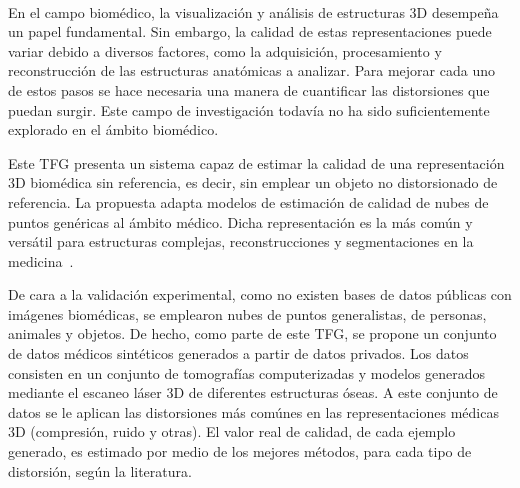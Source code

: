 \chapter*{}


% 


\thispagestyle{empty}

\begin{center}
{\large\bfseries \myTitle}\\
\end{center}
\begin{center}
\myName\\
\end{center}

\\

\\
En el campo biomédico, la visualización y análisis de estructuras 3D
desempeña un papel fundamental. 
Sin embargo, la calidad de estas representaciones puede variar debido a diversos 
factores, como la adquisición, procesamiento y reconstrucción de las estructuras anatómicas a analizar. 
Para mejorar cada uno de estos pasos se hace necesaria una manera de cuantificar las distorsiones que puedan surgir. 
Este campo de investigación todavía no ha sido suficientemente explorado en el ámbito biomédico.
\smallskip

Este TFG presenta un sistema capaz de estimar la calidad de 
una representación 3D biomédica sin referencia, es decir, sin emplear un objeto 
no distorsionado de referencia. La propuesta 
adapta modelos de estimación de calidad de nubes de puntos genéricas 
al ámbito médico. Dicha representación es la más común y versátil para 
estructuras complejas, reconstrucciones y segmentaciones en la medicina~\cite{WhyUsePointCloud}. 
\smallskip

De cara a la validación experimental, como no existen bases de datos públicas con imágenes 
biomédicas, se emplearon nubes de puntos generalistas, de personas, animales y objetos. 
De hecho, como parte de este TFG, se propone un conjunto de datos médicos sintéticos 
generados a partir de datos privados. 
Los datos consisten en un conjunto de tomografías computerizadas y modelos 
generados mediante el escaneo láser 3D de diferentes estructuras óseas. 
A este conjunto de datos se le aplican las distorsiones más comúnes 
en las representaciones médicas 3D (compresión, ruido y otras). 
El valor real de calidad, de cada ejemplo generado, es estimado por medio de 
los mejores métodos, para cada tipo de distorsión, según la literatura. 
\smallskip


